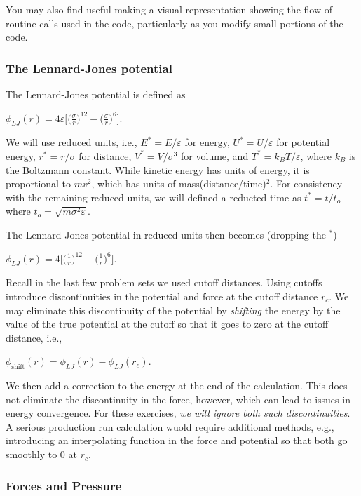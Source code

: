 \documentclass[11pt]{article}
\begin{document}
You may also find useful making a visual representation showing the flow
of routine calls used in the code, particularly as you modify small
portions of the code.

\hypertarget{the-lennard-jones-potential}{%
\subsubsection{The Lennard-Jones
potential}\label{the-lennard-jones-potential}}

The Lennard-Jones potential is defined as

\(\phi_{LJ}(r) = 4\varepsilon\Big[ \Big(\frac{\sigma}{r}\Big)^{12} - \Big(\frac{\sigma}{r}\Big)^{6}\Big]\).

We will use reduced units, i.e., \(E^* = E/\varepsilon\) for energy,
\(U^* = U/\varepsilon\) for potential energy, \(r^* = r/\sigma\) for
distance, \(V^* = V/\sigma^3\) for volume, and
\(T^* = k_B T /\varepsilon\), where \(k_B\) is the Boltzmann constant.
While kinetic energy has units of energy, it is proportional to
\(mv^2\), which has units of mass(distance/time)\(^2\). For consistency
with the remaining reduced units, we will defined a reducted time as
\(t^* = t/t_o\) where \(t_o = \sqrt{m\sigma^2\varepsilon}\).

The Lennard-Jones potential in reduced units then becomes (dropping the
\(^*\))

\(\phi_{LJ}(r) = 4\Big[ \Big(\frac{1}{r}\Big)^{12} - \Big(\frac{1}{r}\Big)^{6}\Big]\).

Recall in the last few problem sets we used cutoff distances. Using
cutoffs introduce discontinuities in the potential and force at the
cutoff distance \(r_c\). We may eliminate this discontinuity of the
potential by \emph{shifting} the energy by the value of the true
potential at the cutoff so that it goes to zero at the cutoff distance,
i.e.,

\(\phi_{\text{shift}}(r) = \phi_{LJ}(r) - \phi_{LJ}(r_c)\).

We then add a correction to the energy at the end of the calculation.
This does not eliminate the discontinuity in the force, however, which
can lead to issues in energy convergence. For these exercises, \emph{we
will ignore both such discontinuities}. A serious production run
calculation wuold require additional methods, e.g., introducing an
interpolating function in the force and potential so that both go
smoothly to 0 at \(r_c\).

\hypertarget{forces-and-pressure}{%
\subsubsection{Forces and Pressure}\label{forces-and-pressure}}
\end{document}
